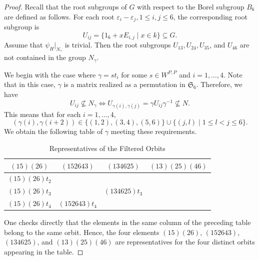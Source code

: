 \documentclass[12pt]{amsart}
\theoremstyle{Theorem}
\theoremstyle{Theorem}
\theoremstyle{Theorem}
\theoremstyle{Theorem}
\theoremstyle{Plain}
\theoremstyle{remark}
\theoremstyle{remark}
\theoremstyle{Definition}
\begin{document}
\begin{proof}
    Recall that the root subgroups of $G$ with respect to the Borel subgroup $B_6$ are defined as follows. For each root $ \varepsilon_i - \varepsilon_j, 1 \le i, j \le 6 $, the corresponding root subgroup is
    \[
        U_{ij} = \{ 1_6 + xE_{i,j} \mid x \in k \} \subseteq G.
    \]
    Assume that $ \psi_{H}|_{ N_\gamma } $ is trivial. Then the root subgroups $ U_{13}, U_{24}, U_{35} $, and $U_{46}$ are not contained in the group $N_\gamma$. 
    
    We begin with the case where $ \gamma = s t_i $ for some $ s \in W^{P, P} $ and $ i = 1, \dots, 4 $. Note that in this case, $\gamma$ is a matrix realized as a permutation in $ \mathfrak{S}_6 $. Therefore, we have
    \[
        U_{ij} \nsubseteq N_\gamma \Longleftrightarrow U_{ \gamma(i), \gamma(j) } = \gamma U_{ij} \gamma^{-1} \nsubseteq N.
    \]
    This means that for each $ i = 1, \dots, 4 $,
    \[
        ( \gamma(i), \gamma(i + 2) ) \in \{ (1,2), (3,4), (5,6) \} \cup \{ (j,l) \mid 1 \le  l < j \le 6 \}.
    \]
    We obtain the following table of $\gamma$ meeting these requirements. 
        \begin{table}[H]
            \centering
            \caption{Representatives of the Filtered Orbits}
            \label{tab:example}
            \begin{tabular}{|c|c|c|c|}
                \hline
                $(15)(26)$     & $(152643)$     & $(134625)$     & $(13)(25)(46)$ \\ 
                \hline
                $(15)(26) t_2$ &                &                &                \\
                \hline
                $(15)(26) t_3$ &                & $(134625) t_3$ &                \\
                \hline
                $(15)(26) t_4$ & $(152643) t_4$ &                &                \\
                \hline
            \end{tabular}
        \end{table}
    One checks directly that the elements in the same column of the preceding table belong to the same orbit. Hence, the four elements $(15)(26)$, $(152643)$, $(134625)$, and $(13)(25)(46)$ are representatives for the four distinct orbits appearing in the table.
    

\end{proof}
\end{document}
